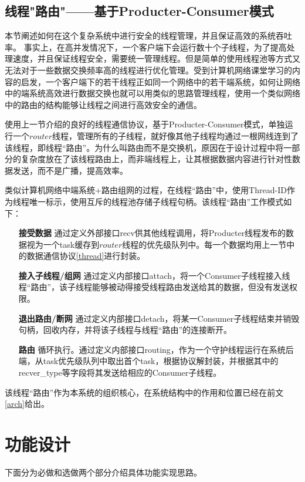 \documentclass[UTF8]{ctexart}
\begin{document}
\subsection{线程"路由"——基于Producter-Consumer模式}\label{router}
本节阐述如何在这个复杂系统中进行安全的线程管理，并且保证高效的系统吞吐率。
事实上，在高并发情况下，一个客户端下会运行数十个子线程，为了提高处理速度，并且保证线程安全，需要统一管理线程。但是简单的使用线程池等方式又无法对于一些数据交换频率高的线程进行优化管理。受到计算机网络课堂学习的内容的启发，一个客户端下的若干线程正如同一个网络中的若干端系统，如何让网络中的端系统高效进行数据交换也就可以用类似的思路管理线程，使用一个类似网络中的路由的结构能够让线程之间进行高效安全的通信。

使用上一节介绍的良好的线程通信协议，基于Producter-Consumer模式，单独运行一个$router$线程，管理所有的子线程，就好像其他子线程均通过一根网线连到了该线程，即线程“路由”。为什么叫路由而不是交换机，原因在于设计过程中将一部分的复杂度放在了该线程路由上，而非端线程上，让其根据数据内容进行针对性数据发送，而不是广播，提高效率。

类似计算机网络中端系统+路由组网的过程，在线程“路由”中，使用Thread-ID作为线程唯一标示，使用互斥的线程池存储子线程句柄。该线程“路由”工作模式如下：
\begin{itemize}
    \item[\textbf{接受数据}]通过定义外部接口recv供其他线程调用，将Producter线程发布的数据视为一个task缓存到$router$线程的优先级队列中。每一个数据均用上一节中的数据通信协议\ref{thread}进行封装。
    \item[\textbf{接入子线程/组网}]通过定义内部接口attach，将一个Consumer子线程接入线程“路由”，该子线程能够被动得接受线程路由发送给其的数据，但没有发送权限。
    \item[\textbf{退出路由/断网}]通过定义内部接口detach，将某一Consumer子线程结束并销毁句柄，回收内存，并将该子线程与线程“路由”的连接断开。
    \item[\textbf{路由}]循环执行。通过定义内部接口routing，作为一个守护线程运行在系统后端，从task优先级队列中取出首个task，根据协议解封装，并根据其中的recver\_type等字段将其发送给相应的Consumer子线程。
\end{itemize}

该线程“路由”作为本系统的组织核心，在系统结构中的作用和位置已经在前文\ref{arch}给出。


\section{功能设计}
下面分为必做和选做两个部分介绍具体功能实现思路。
\end{document}
